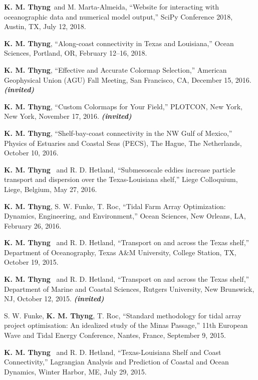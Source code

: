\documentclass[10pt,letterpaper]{article}
\newcommand{\kmt}{\textbf{K. M. Thyng}}
\newcommand{\inv}{\textbf{\textit{(invited)}}}
\renewenvironment{itemize}{
  \begin{list}{}{
    \setlength{\leftmargin}{1.5em}
    \setlength{\itemsep}{0.25em}
    \setlength{\parskip}{0pt}
    \setlength{\parsep}{0.25em}
  }
}{
  \end{list}
}
\begin{document}
\begin{itemize}
\item \kmt~and M. Marta-Almeida, ``Website for interacting with oceanographic data and numerical model output,'' SciPy Conference 2018, Austin, TX, July 12, 2018.

\item \kmt, ``Along-coast connectivity in Texas and Louisiana,'' Ocean Sciences, Portland, OR, February 12--16, 2018.

\item \kmt, ``Effective and Accurate Colormap Selection,'' American Geophysical Union (AGU) Fall Meeting, San Francisco, CA, December 15, 2016. \inv

\item \kmt, ``Custom Colormaps for Your Field,'' PLOTCON, New York, New York, November 17, 2016. \inv

\item \kmt, ``Shelf-bay-coast connectivity in the NW Gulf of Mexico,'' Physics of Estuaries and Coastal Seas (PECS), The Hague, The Netherlands, October 10, 2016.

\item \kmt~ and R. D. Hetland, ``Submesoscale eddies increase particle transport and dispersion over the Texas-Louisiana shelf,'' Liege Colloquium, Liege, Belgium, May 27, 2016.

\item \kmt, S. W. Funke, T. Roc, ``Tidal Farm Array Optimization: Dynamics, Engineering, and Environment,'' Ocean Sciences, New Orleans, LA, February 26, 2016.

\item \kmt~ and R. D. Hetland, ``Transport on and across the Texas shelf,'' Department of Oceanography, Texas A\&M University, College Station, TX, October 19, 2015.

\item \kmt~ and R. D. Hetland, ``Transport on and across the Texas shelf,'' Department of Marine and Coastal Sciences, Rutgers University, New Brunswick, NJ, October 12, 2015. \inv

\item S. W. Funke, \kmt, T. Roc, ``Standard methodology for tidal array project optimisation: An idealized study of the Minas Passage,'' 11th European Wave and Tidal Energy Conference, Nantes, France, September 9, 2015.

\item \kmt~ and R. D. Hetland, ``Texas-Louisiana Shelf and Coast Connectivity,'' Lagrangian Analysis and Prediction of Coastal and Ocean Dynamics, Winter Harbor, ME, July 29, 2015.


\end{itemize}
\end{document}
